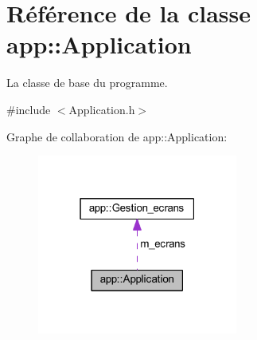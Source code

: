 \section{Référence de la classe app\+:\+:Application}
\label{classapp_1_1_application}


La classe de base du programme.  




{\ttfamily \#include $<$Application.\+h$>$}



Graphe de collaboration de app\+:\+:Application\+:\nopagebreak
\begin{figure}[H]
\begin{center}
\leavevmode
\includegraphics[width=187pt]{classapp_1_1_application__coll__graph}
\end{center}
\end{figure}

